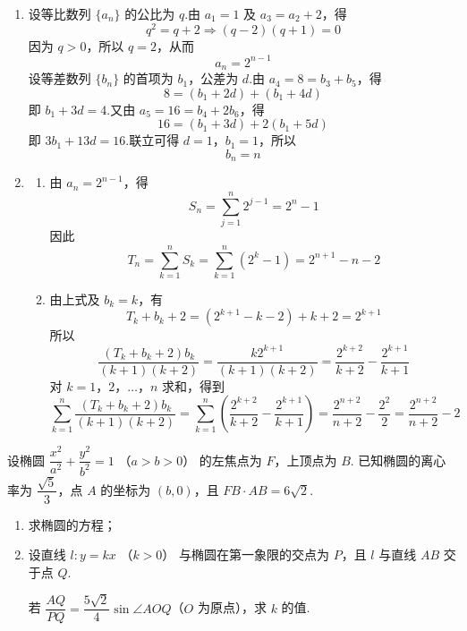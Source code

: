 \begin{solution}
\begin{enumerate}
\item 设等比数列 \(\{a_n\}\) 的公比为 \(q\).由 \(a_1=1\) 及 \(a_3=a_2+2\)，得
\[
q^2=q+2\Longrightarrow(q-2)(q+1)=0
\]
因为 \(q>0\)，所以 \(q=2\)，从而
\[
a_n=2^{n-1}
\]
设等差数列 \(\{b_n\}\) 的首项为 \(b_1\)，公差为 \(d\).由 \(a_4=8=b_3+b_5\)，得
\[
8=(b_1+2d)+(b_1+4d)
\]
即 \(b_1+3d=4\).又由 \(a_5=16=b_4+2b_6\)，得
\[
16=(b_1+3d)+2(b_1+5d)
\]
即 \(3b_1+13d=16\).联立可得 \(d=1\)，\(b_1=1\)，所以
\[
b_n=n
\]

\item
\begin{enumerate}
\item 由 \(a_n=2^{n-1}\)，得
\[
S_n=\sum_{j=1}^n2^{j-1}=2^n-1
\]
因此
\[
T_n=\sum_{k=1}^nS_k
=\sum_{k=1}^n(2^k-1)
=2^{n+1}-n-2
\]

\item 由上式及 \(b_k=k\)，有
\[
T_k+b_k+2=(2^{k+1}-k-2)+k+2=2^{k+1}
\]
所以
\[
\frac{(T_k+b_k+2)b_k}{(k+1)(k+2)}
=\frac{k2^{k+1}}{(k+1)(k+2)}
=\frac{2^{k+2}}{k+2}-\frac{2^{k+1}}{k+1}
\]
对 \(k=1\)，\(2\)，\(\ldots\)，\(n\) 求和，得到
\[
\sum_{k=1}^n\frac{(T_k+b_k+2)b_k}{(k+1)(k+2)}
=\sum_{k=1}^n\left(\frac{2^{k+2}}{k+2}-\frac{2^{k+1}}{k+1}\right)
=\frac{2^{n+2}}{n+2}-\frac{2^2}{2}
=\frac{2^{n+2}}{n+2}-2
\]
\end{enumerate}
\end{enumerate}
\end{solution}

\begin{problem}

设椭圆 \(\dfrac{x^2}{a^2}+\dfrac{y^2}{b^2}=1\) （\(a>b>0\)） 的左焦点为 \(F\)，上顶点为 \(B\). 已知椭圆的离心率为 \(\dfrac{\sqrt5}{3}\)，点 \(A\) 的坐标为 \((b,0)\)，且 \(FB\cdot AB=6\sqrt2\).

\begin{enumerate}
\item 求椭圆的方程；
\item 设直线 \(l:y=kx\) （\(k>0\)） 与椭圆在第一象限的交点为 \(P\)，且 \(l\) 与直线 \(AB\) 交于点 \(Q\).

若 \(\dfrac{AQ}{PQ}=\dfrac{5\sqrt2}{4}\sin\angle AOQ\)（\(O\) 为原点），求 \(k\) 的值.
\end{enumerate}
\end{problem}

